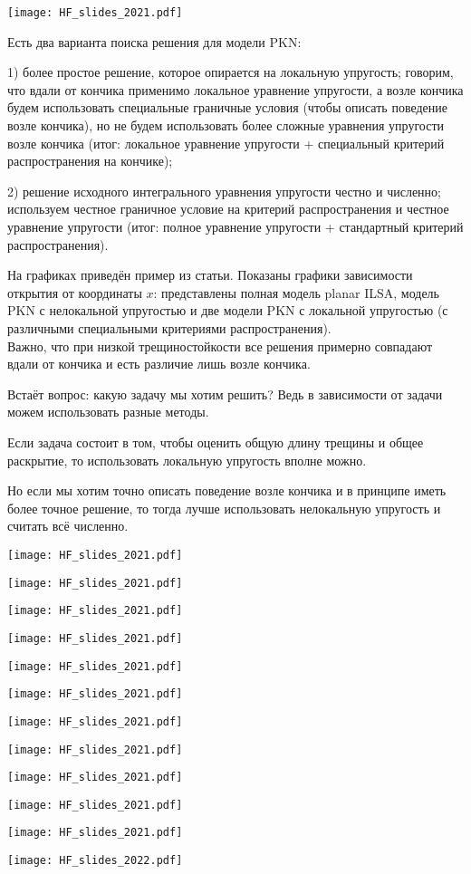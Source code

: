 \documentclass[main.tex]{subfiles}
\begin{document}
\texttt{[image: HF\_slides\_2021.pdf]}

Есть два варианта поиска решения для модели PKN:

1) более простое решение, которое опирается на локальную упругость;
говорим, что вдали от кончика применимо локальное уравнение упругости, а возле кончика будем использовать специальные граничные условия (чтобы описать поведение возле кончика), но не будем использовать более сложные уравнения упругости возле кончика (итог: локальное уравнение упругости + специальный критерий распространения на кончике);

2) решение исходного интегрального уравнения упругости честно и численно;
используем честное граничное условие на критерий распространения и честное уравнение упругости (итог: полное уравнение упругости + стандартный критерий распространения).

На графиках приведён пример из статьи.
Показаны графики зависимости открытия от координаты $x$: представлены полная модель planar ILSA, модель PKN с нелокальной упругостью и две модели PKN с локальной упругостью (с различными специальными критериями распространения).
\\

Важно, что при низкой трещиностойкости все решения примерно совпадают вдали от кончика и есть различие лишь возле кончика.

Встаёт вопрос: какую задачу мы хотим решить?
Ведь в зависимости от задачи можем использовать разные методы.

Если задача состоит в том, чтобы оценить общую длину трещины и общее раскрытие, то использовать локальную упругость вполне можно.

Но если мы хотим точно описать поведение возле кончика и в принципе иметь более точное решение, то тогда лучше использовать нелокальную упругость и считать всё численно.

\texttt{[image: HF\_slides\_2021.pdf]}

\texttt{[image: HF\_slides\_2021.pdf]}

\texttt{[image: HF\_slides\_2021.pdf]}

\texttt{[image: HF\_slides\_2021.pdf]}

\texttt{[image: HF\_slides\_2021.pdf]}

\texttt{[image: HF\_slides\_2021.pdf]}

\texttt{[image: HF\_slides\_2021.pdf]}

\texttt{[image: HF\_slides\_2021.pdf]}

\texttt{[image: HF\_slides\_2021.pdf]}

\texttt{[image: HF\_slides\_2021.pdf]}

\texttt{[image: HF\_slides\_2021.pdf]}

\texttt{[image: HF\_slides\_2022.pdf]}
\end{document}
